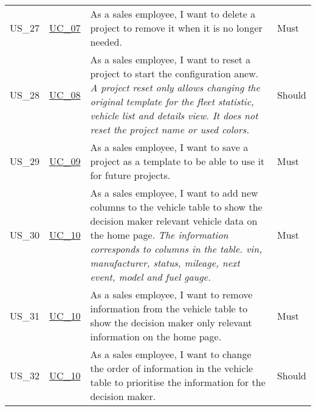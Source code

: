 \begin{footnotesize}
\begin{longtable}[L L L L]{ p{} p{} p{} p{} }
      \hypertarget{Ref:US27}{US\_27} & \hyperlink{Ref:UC7}{UC\_07} & As a sales employee, I want to delete a project to remove it when it is no longer needed. & Must \\
      \hypertarget{Ref:US28}{US\_28} & \hyperlink{Ref:UC8}{UC\_08} & As a sales employee, I want to reset a project to start the configuration anew. 
      \newline
      \emph{A project reset only allows changing the original template for the fleet statistic, vehicle list and details view. It does not reset the project name or used colors.} & Should \\
      \hypertarget{Ref:US29}{US\_29} & \hyperlink{Ref:UC9}{UC\_09} & As a sales employee, I want to save a project as a template to be able to use it for future projects. & Must \\
      \hypertarget{Ref:US30}{US\_30} & \hyperlink{Ref:UC10}{UC\_10} & As a sales employee, I want to add new columns to the vehicle table to show the decision maker relevant vehicle data on the home page.
      \newline
      \emph{The information corresponds to columns in the table. \gls{vin}, manufacturer, status, mileage, next event, model and fuel gauge.} & Must  \\
      \hypertarget{Ref:US31}{US\_31} & \hyperlink{Ref:UC10}{UC\_10} & As a sales employee, I want to remove information from the vehicle table to show the decision maker only relevant information on the home page. & Must  \\
      \hypertarget{Ref:US32}{US\_32} & \hyperlink{Ref:UC10}{UC\_10} & As a sales employee, I want to change the order of information in the vehicle table to prioritise the information for the decision maker. & Should  \\


\end{longtable}
\end{footnotesize}
